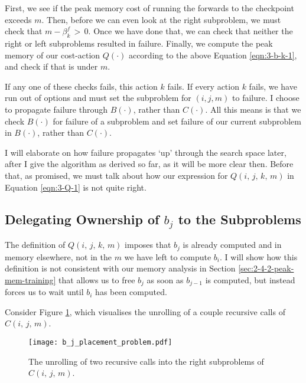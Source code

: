 First, we see if the peak memory cost of running the forwards to the checkpoint exceeds \(m\).
Then, before we can even look at the right subproblem, we must check that \(m - \beta^f_k \,>\, 0\).
Once we have done that, we can check that neither the right or left subproblems resulted in failure.
Finally, we compute the peak memory of our cost-action \(Q(\cdot)\) according to the above Equation \ref{eqn:3-b-k-1}, and check if that is under \(m\).

If any one of these checks fails, this action \(k\) fails.
If every action \(k\) fails, we have run out of options and must set the subproblem for \((i, j, m)\) to failure.
I choose to propagate failure through \(B(\cdot)\), rather than \(C(\cdot)\).
All this means is that we check \(B(\cdot)\) for failure of a subproblem and set failure of our current subproblem in \(B(\cdot)\), rather than \(C(\cdot)\).

I will elaborate on how failure propagates `up' through the search space later, after I give the algorithm as derived so far, as it will be more clear then.
Before that, as promised, we must talk about how our expression for \(Q(i,\,j,\,k,\,m)\) in Equation \ref{eqn:3-Q-1} is not quite right.

\subsection{Delegating Ownership of \texorpdfstring{\(b_j\)}{\textit{b\_j}} to the Subproblems}
The definition of \(Q(i,\,j,\,k,\,m)\) imposes that \(b_j\) is already computed and in memory elsewhere, not in the \(m\) we have left to compute \(b_i\).
I will show how this definition is not consistent with our memory analysis in Section \ref{sec:2-4-2-peak-mem-training} that allows us to free \(b_j\) as soon as \(b_{j-1}\) is computed, but instead forces us to wait until \(b_i\) has been computed.

Consider Figure \ref{fig:3-b-j-placement-problem}, which visualises the unrolling of a couple recursive calls of \(C(i,\,j,\,m)\).

\begin{figure}[ht]
    \centering
    \texttt{[image: b\_j\_placement\_problem.pdf]}
    \caption{The unrolling of two recursive calls into the right subproblems of \(C(i,\,j,\,m)\).}
    \label{fig:3-b-j-placement-problem}
\end{figure}

